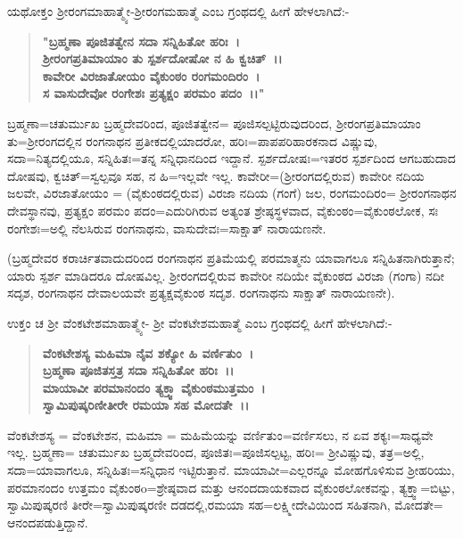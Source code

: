 ಯಥೋಕ್ತಂ ಶ‍್ರೀರಂಗಮಾಹಾತ್ಮ್ಯೇ-ಶ‍್ರೀರಂಗಮಹಾತ್ಮೆ ಎಂಬ ಗ್ರಂಥದಲ್ಲಿ ಹೀಗೆ ಹೇಳಲಾಗಿದೆ:-

\begin{verse}
\textbf{"ಬ್ರಹ್ಮಣಾ ಪೂಜಿತತ್ವೇನ ಸದಾ ಸನ್ನಿಹಿತೋ ಹರಿಃ~।}\\\textbf{ಶ‍್ರೀರಂಗಪ್ರತಿಮಾಯಾಂ ತು ಸ್ಪರ್ಶದೋಷೋ ನ ಹಿ ಕ್ವಚಿತ್~।।}\\\textbf{ಕಾವೇರೀ ವಿರಜಾತೋಯಂ ವೈಕುಂಠಂ ರಂಗಮಂದಿರಂ~।}\\\textbf{ಸ ವಾಸುದೇವೋ ರಂಗೇಶಃ ಪ್ರತ್ಯಕ್ಷಂ ಪರಮಂ ಪದಂ~।।"}
\end{verse}


ಬ್ರಹ್ಮಣಾ=ಚತುರ್ಮುಖ ಬ್ರಹ್ಮದೇವರಿಂದ, ಪೂಜಿತತ್ವೇನ= ಪೂಜಿಸಲ್ಪಟ್ಟಿರುವುದರಿಂದ, ಶ‍್ರೀರಂಗಪ್ರತಿಮಾಯಾಂ ತು=ಶ‍್ರೀರಂಗದಲ್ಲಿನ ರಂಗನಾಥನ ಪ್ರತೀಕದಲ್ಲಿಯಾದರೋ, ಹರಿಃ=ಪಾಪಪರಿಹಾರಕನಾದ ವಿಷ್ಣುವು, ಸದಾ=ನಿತ್ಯದಲ್ಲಿಯೂ, ಸನ್ನಿಹಿತಃ=ತನ್ನ ಸನ್ನಿಧಾನದಿಂದ ಇದ್ದಾನೆ. ಸ್ಪರ್ಶದೋಷಃ=ಇತರರ ಸ್ಪರ್ಶದಿಂದ ಆಗಬಹುದಾದ ದೋಷವು, ಕ್ವಚಿತ್=\-ಸ್ವಲ್ಪವೂ ಸಹ, ನ ಹಿ=ಇಲ್ಲವೇ ಇಲ್ಲ. ಕಾವೇರೀ=(ಶ‍್ರೀರಂಗದಲ್ಲಿರುವ) ಕಾವೇರೀ ನದಿಯ ಜಲವೇ, ವಿರಜಾತೋಯಂ = (ವೈಕುಂಠದಲ್ಲಿರುವ) ವಿರಜಾ ನದಿಯ (ಗಂಗೆ) ಜಲ, ರಂಗಮಂದಿರಂ= ಶ‍್ರೀರಂಗನಾಥನ ದೇವಸ್ಥಾನವು, ಪ್ರತ್ಯಕ್ಷಂ ಪರಮಂ ಪದಂ=ಎದುರಿಗಿರುವ ಅತ್ಯಂತ ಶ್ರೇಷ್ಠಸ್ಥಳವಾದ, ವೈಕುಂಠಂ=ವೈಕುಂಠಲೋಕ, ಸಃ ರಂಗೇಶಃ=ಅಲ್ಲಿ ನೆಲಸಿರುವ ರಂಗನಾಥನು, ವಾಸುದೇವಃ=ಸಾಕ್ಷಾತ್ ನಾರಾಯಣನೇ.

(ಬ್ರಹ್ಮದೇವರ ಕರಾರ್ಚಿತವಾದುದರಿಂದ ರಂಗನಾಥನ ಪ್ರತಿಮೆಯಲ್ಲಿ ಪರಮಾತ್ಮನು ಯಾವಾಗಲೂ ಸನ್ನಿಹಿತನಾಗಿರುತ್ತಾನೆ; ಯಾರು ಸ್ಪರ್ಶ ಮಾಡಿದರೂ ದೋಷವಿಲ್ಲ. ಶ‍್ರೀರಂಗ\-ದಲ್ಲಿರುವ ಕಾವೇರೀ ನದಿಯೇ ವೈಕುಂಠದ ವಿರಜಾ (ಗಂಗಾ) ನದೀ ಸದೃಶ, ರಂಗನಾಥನ ದೇವಾಲಯವೇ ಪ್ರತ್ಯಕ್ಷವೈಕುಂಠ ಸದೃಶ. ರಂಗನಾಥನು ಸಾಕ್ಷಾತ್ ನಾರಾಯಣನೇ).

ಉಕ್ತಂ ಚ ಶ‍್ರೀ ವೆಂಕಟೇಶಮಾಹಾತ್ಮ್ಯೇ- ಶ‍್ರೀ ವೆಂಕಟೇಶಮಹಾತ್ಮೆ ಎಂಬ ಗ್ರಂಥದಲ್ಲಿ ಹೀಗೆ ಹೇಳಲಾಗಿದೆ:-

\begin{verse}
\textbf{ವೆಂಕಟೇಶಸ್ಯ ಮಹಿಮಾ ನೈವ ಶಕ್ಯೋ ಹಿ ವರ್ಣಿತುಂ~।}\\\textbf{ಬ್ರಹ್ಮಣಾ ಪೂಜಿತಸ್ತತ್ರ ಸದಾ ಸನ್ನಿಹಿತೋ ಹರಿಃ~।।}\\\textbf{ಮಾಯಾವೀ ಪರಮಾನಂದಂ ತ್ಯಕ್ತ್ವಾ ವೈಕುಂಠಮುತ್ತಮಂ~।}\\\textbf{ಸ್ವಾಮಿಪುಷ್ಕರಿಣೀತೀರೇ ರಮಯಾ ಸಹ ಮೋದತೇ~।।}
\end{verse}

ವೆಂಕಟೇಶಸ್ಯ = ವೆಂಕಟೇಶನ, ಮಹಿಮಾ = ಮಹಿಮೆಯನ್ನು ವರ್ಣಿತುಂ=ವರ್ಣಿಸಲು, ನ ಏವ ಶಕ್ಯಃ=ಸಾಧ್ಯವೇ ಇಲ್ಲ. ಬ್ರಹ್ಮಣಾ= ಚತುರ್ಮುಖ ಬ್ರಹ್ಮದೇವರಿಂದ, ಪೂಜಿತಃ\break =ಪೂಜಿಸಲ್ಪಟ್ಟ, ಹರಿಃ= ಶ‍್ರೀವಿಷ್ಣುವು, ತತ್ರ=ಅಲ್ಲಿ, ಸದಾ=ಯಾವಾಗಲೂ, ಸನ್ನಿಹಿತಃ=\break ಸನ್ನಿಧಾನ ಇಟ್ಟಿರುತ್ತಾನೆ. ಮಾಯಾವೀ=ಎಲ್ಲರನ್ನೂ ಮೋಹಗೊಳಿಸುವ ಶ‍್ರೀಹರಿಯು, ಪರಮಾನಂದಂ ಉತ್ತಮಂ ವೈಕುಂಠo=ಶ್ರೇಷ್ಠವಾದ ಮತ್ತು ಆನಂದದಾಯಕವಾದ ವೈಕುಂಠಲೋಕವನ್ನು, ತ್ಯಕ್ತ್ವಾ=ಬಿಟ್ಟು, ಸ್ವಾಮಿಪುಷ್ಕರಣಿ ತೀರೇ=ಸ್ವಾಮಿಪುಷ್ಕರಣೀ ದಡದಲ್ಲಿ,\break ರಮಯಾ ಸಹ=ಲಕ್ಷ್ಮೀದೇವಿಯಿಂದ ಸಹಿತನಾಗಿ, ಮೋದತೇ= ಆನಂದಪಡುತ್ತಿದ್ದಾನೆ.

